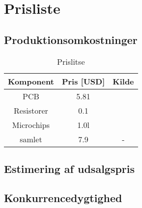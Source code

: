 \section{Prisliste}
\subsection{Produktionsomkostninger}

% 

\begin{table}[H] \label{vores}
	\caption{Prislitse} %
	\centering
		\begin{tabular}{c|c c} 
		
		Komponent & Pris [USD] & Kilde\\ [0.5ex] 
		\hline 
			PCB & 5.81 & \cite{PCB}\\ 
			Resistorer & 0.1&\cite{resistor} \\
			Microchips & 1.0l& \cite{microchip}\\
			samlet & 7.9 & -\\ [1ex]
		\hline %
	\end{tabular}
\end{table}


\subsection{Estimering af udsalgspris}
\subsection{Konkurrencedygtighed}